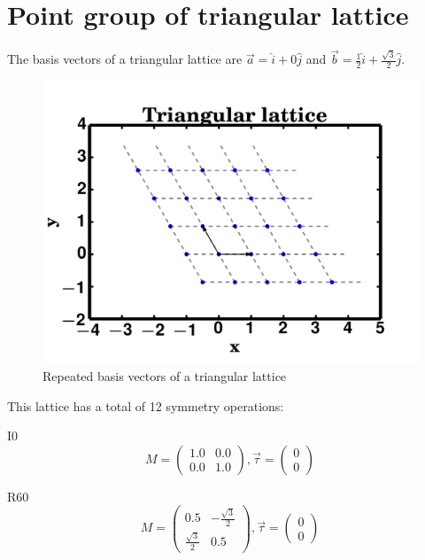 \documentclass[12pt, fleqn]{article}
\begin{document}
\section{Point group of triangular lattice}
The basis vectors of a triangular lattice are $\vec{a}=\hat{i}+0\hat{j}$
and $\vec{b}=\frac{1}{2}\hat{i}+\frac{\sqrt{3}}{2}\hat{j}$.

\begin{figure}[h]
    \begin{center}
        \includegraphics[max width=\textwidth]{./triangular.png}
    \end{center}
    \caption{Repeated basis vectors of a triangular lattice}
    \label{fig:triangular}
\end{figure}

This lattice has a total of 12 symmetry operations:

I0
\begin{equation}
    M=
    \begin{pmatrix}
        1.0&0.0\\
        0.0&1.0
    \end{pmatrix}
    ,\vec{\tau}=
    \begin{pmatrix}
        0\\
        0
    \end{pmatrix}
    \label{I0}
\end{equation}

R60
\begin{equation}
    M=
    \begin{pmatrix}
        0.5&-\frac{\sqrt{3}}{2}\\
        \frac{\sqrt{3}}{2}&0.5
    \end{pmatrix}
    ,\vec{\tau}=
    \begin{pmatrix}
        0\\
        0
    \end{pmatrix}
    \label{R60}
\end{equation}
\end{document}

